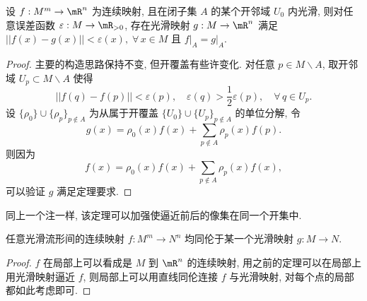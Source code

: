         \begin{theorem}[用光滑映射逼近连续映射且保持在某个闭集不动]
            设 $f:M^m\rightarrow\mR^n$ 为连续映射, 且在闭子集 $A$ 的某个开邻域 $U_0$ 内光滑, 则对任意误差函数 $\varepsilon:M\rightarrow\mR_{>0}$,
            存在光滑映射 $g:M\rightarrow\mR^n$ 满足 $||f(x)-g(x)||<\varepsilon(x),\;\forall\,x\in M$ 且 $f\big|_A = g\big|_A$.
        \end{theorem}
        \begin{proof}
            主要的构造思路保持不变, 但开覆盖有些许变化. 对任意 $p\in M\backslash A$, 取开邻域 $U_p\subset M\backslash A$ 使得 
            \begin{equation*}
                ||f(q)-f(p)||<\varepsilon(p),\quad\varepsilon(q)>\frac{1}{2}\varepsilon(p),\quad\forall\,q\in U_p.
            \end{equation*}
            设 $\{\rho_0\}\cup\{\rho_p\}_{p\notin A}$ 为从属于开覆盖 $\{U_0\}\cup\{U_p\}_{p\notin A}$ 的单位分解, 令
            \begin{equation*}
                g(x) = \rho_0(x)f(x) + \sum_{p\notin A}\rho_p(x)f(p).
            \end{equation*}
            则因为
            \begin{equation*}
                f(x) = \rho_0(x)f(x) + \sum_{p\notin A}\rho_p(x)f(x), 
            \end{equation*}
            可以验证 $g$ 满足定理要求.
        \end{proof}
        \begin{remark}
            同上一个注一样, 该定理可以加强使逼近前后的像集在同一个开集中.
        \end{remark}
        \begin{theorem}[任意连续映射都同伦于一个光滑映射]
            任意光滑流形间的连续映射 $f:M^m\rightarrow N^n$ 均同伦于某一个光滑映射 $g:M\rightarrow N$.
        \end{theorem}
        \begin{proof}
            $f$ 在局部上可以看成是 $M$ 到 $\mR^n$ 的连续映射, 用之前的定理可以在局部上用光滑映射逼近 $f$, 则局部上可以用直线同伦连接 $f$ 与光滑映射, 对每个点的局部都如此考虑即可.

            
        \end{proof}